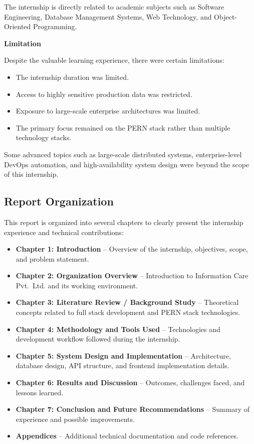 The internship is directly related to academic subjects such as Software Engineering, Database Management Systems, Web Technology, and Object-Oriented Programming.

\textbf{Limitation}

Despite the valuable learning experience, there were certain limitations:

\begin{itemize}
  \item The internship duration was limited.
  \item Access to highly sensitive production data was restricted.
  \item Exposure to large-scale enterprise architectures was limited.
  \item The primary focus remained on the PERN stack rather than multiple technology stacks.
\end{itemize}

Some advanced topics such as large-scale distributed systems, enterprise-level DevOps automation, and high-availability system design were beyond the scope of this internship.

\subsection{Report Organization}

This report is organized into several chapters to clearly present the internship experience and technical contributions:

\begin{itemize}
  \item \textbf{Chapter 1: Introduction} – Overview of the internship, objectives, scope, and problem statement.
  \item \textbf{Chapter 2: Organization Overview} – Introduction to Information Care Pvt.\ Ltd. and its working environment.
  \item \textbf{Chapter 3: Literature Review / Background Study} – Theoretical concepts related to full stack development and PERN stack technologies.
  \item \textbf{Chapter 4: Methodology and Tools Used} – Technologies and development workflow followed during the internship.
  \item \textbf{Chapter 5: System Design and Implementation} – Architecture, database design, API structure, and frontend implementation details.
  \item \textbf{Chapter 6: Results and Discussion} – Outcomes, challenges faced, and lessons learned.
  \item \textbf{Chapter 7: Conclusion and Future Recommendations} – Summary of experience and possible improvements.
  \item \textbf{Appendices} – Additional technical documentation and code references.
\end{itemize}